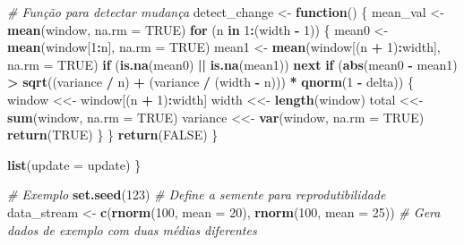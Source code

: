 \documentclass[
]{article}
\newenvironment{Shaded}{\begin{snugshade}}{\end{snugshade}}
\newcommand{\AttributeTok}[1]{\textcolor[rgb]{0.13,0.29,0.53}{#1}}
\newcommand{\CommentTok}[1]{\textcolor[rgb]{0.56,0.35,0.01}{\textit{#1}}}
\newcommand{\ConstantTok}[1]{\textcolor[rgb]{0.56,0.35,0.01}{#1}}
\newcommand{\ControlFlowTok}[1]{\textcolor[rgb]{0.13,0.29,0.53}{\textbf{#1}}}
\newcommand{\DecValTok}[1]{\textcolor[rgb]{0.00,0.00,0.81}{#1}}
\newcommand{\FunctionTok}[1]{\textcolor[rgb]{0.13,0.29,0.53}{\textbf{#1}}}
\newcommand{\NormalTok}[1]{#1}
\newcommand{\OtherTok}[1]{\textcolor[rgb]{0.56,0.35,0.01}{#1}}
\newcommand{\SpecialCharTok}[1]{\textcolor[rgb]{0.81,0.36,0.00}{\textbf{#1}}}
\begin{document}
\begin{Shaded}
\begin{Highlighting}[]
  \CommentTok{\# Função para detectar mudança}
\NormalTok{  detect\_change }\OtherTok{\textless{}{-}} \ControlFlowTok{function}\NormalTok{() \{}
\NormalTok{    mean\_val }\OtherTok{\textless{}{-}} \FunctionTok{mean}\NormalTok{(window, }\AttributeTok{na.rm =} \ConstantTok{TRUE}\NormalTok{)}
    \ControlFlowTok{for}\NormalTok{ (n }\ControlFlowTok{in} \DecValTok{1}\SpecialCharTok{:}\NormalTok{(width }\SpecialCharTok{{-}} \DecValTok{1}\NormalTok{)) \{}
\NormalTok{      mean0 }\OtherTok{\textless{}{-}} \FunctionTok{mean}\NormalTok{(window[}\DecValTok{1}\SpecialCharTok{:}\NormalTok{n], }\AttributeTok{na.rm =} \ConstantTok{TRUE}\NormalTok{)}
\NormalTok{      mean1 }\OtherTok{\textless{}{-}} \FunctionTok{mean}\NormalTok{(window[(n }\SpecialCharTok{+} \DecValTok{1}\NormalTok{)}\SpecialCharTok{:}\NormalTok{width], }\AttributeTok{na.rm =} \ConstantTok{TRUE}\NormalTok{)}
      \ControlFlowTok{if}\NormalTok{ (}\FunctionTok{is.na}\NormalTok{(mean0) }\SpecialCharTok{||} \FunctionTok{is.na}\NormalTok{(mean1)) }\ControlFlowTok{next}
      \ControlFlowTok{if}\NormalTok{ (}\FunctionTok{abs}\NormalTok{(mean0 }\SpecialCharTok{{-}}\NormalTok{ mean1) }\SpecialCharTok{\textgreater{}} \FunctionTok{sqrt}\NormalTok{((variance }\SpecialCharTok{/}\NormalTok{ n) }\SpecialCharTok{+}\NormalTok{ (variance }\SpecialCharTok{/}\NormalTok{ (width }\SpecialCharTok{{-}}\NormalTok{ n))) }\SpecialCharTok{*} \FunctionTok{qnorm}\NormalTok{(}\DecValTok{1} \SpecialCharTok{{-}}\NormalTok{ delta)) \{}
\NormalTok{        window }\OtherTok{\textless{}\textless{}{-}}\NormalTok{ window[(n }\SpecialCharTok{+} \DecValTok{1}\NormalTok{)}\SpecialCharTok{:}\NormalTok{width]}
\NormalTok{        width }\OtherTok{\textless{}\textless{}{-}} \FunctionTok{length}\NormalTok{(window)}
\NormalTok{        total }\OtherTok{\textless{}\textless{}{-}} \FunctionTok{sum}\NormalTok{(window, }\AttributeTok{na.rm =} \ConstantTok{TRUE}\NormalTok{)}
\NormalTok{        variance }\OtherTok{\textless{}\textless{}{-}} \FunctionTok{var}\NormalTok{(window, }\AttributeTok{na.rm =} \ConstantTok{TRUE}\NormalTok{)}
        \FunctionTok{return}\NormalTok{(}\ConstantTok{TRUE}\NormalTok{)}
\NormalTok{      \}}
\NormalTok{    \}}
    \FunctionTok{return}\NormalTok{(}\ConstantTok{FALSE}\NormalTok{)}
\NormalTok{  \}}
  
  \FunctionTok{list}\NormalTok{(}\AttributeTok{update =}\NormalTok{ update)}
\NormalTok{\}}

\CommentTok{\# Exemplo }
\FunctionTok{set.seed}\NormalTok{(}\DecValTok{123}\NormalTok{) }\CommentTok{\# Define a semente para reprodutibilidade}
\NormalTok{data\_stream }\OtherTok{\textless{}{-}} \FunctionTok{c}\NormalTok{(}\FunctionTok{rnorm}\NormalTok{(}\DecValTok{100}\NormalTok{, }\AttributeTok{mean =} \DecValTok{20}\NormalTok{), }\FunctionTok{rnorm}\NormalTok{(}\DecValTok{100}\NormalTok{, }\AttributeTok{mean =} \DecValTok{25}\NormalTok{)) }\CommentTok{\# Gera dados de exemplo com duas médias diferentes}


\end{Highlighting}
\end{Shaded}
\end{document}
